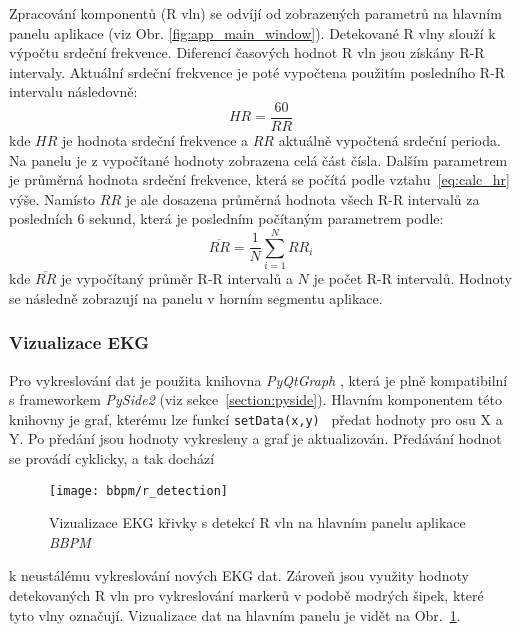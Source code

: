 Zpracování komponentů (R vln) se odvíjí od zobrazených parametrů na hlavním
panelu aplikace (viz Obr. \ref{fig:app_main_window}). Detekované R vlny slouží k 
výpočtu srdeční frekvence. Diferencí časových hodnot R vln jsou získány R-R intervaly. 
Aktuální srdeční frekvence je poté vypočtena použitím posledního R-R intervalu následovně:
\begin{equation}
    \label{eq:calc_hr}
    HR = \frac{60}{RR}
\end{equation}
kde $HR$ je hodnota srdeční frekvence a $RR$ aktuálně vypočtená srdeční
perioda. Na panelu je z vypočítané hodnoty zobrazena celá část čísla. Dalším
parametrem je průměrná hodnota srdeční frekvence, která se počítá podle
vztahu~\ref{eq:calc_hr} výše. Namísto $RR$ je ale dosazena průměrná hodnota
všech R-R intervalů za posledních 6 sekund, která je posledním počítaným
parametrem podle:
\begin{equation}
    \overline{RR} = \frac{1}{N} \sum_{i=1}^N RR_i
\end{equation}
kde $\overline{RR}$ je vypočítaný průměr R-R intervalů a $N$ je počet R-R
intervalů. Hodnoty se následně zobrazují na panelu v horním segmentu aplikace.

\subsubsection{Vizualizace EKG}
\label{section:visual}
Pro vykreslování dat je použita knihovna \textit{PyQtGraph} \cite{PyQtGraph},
která je plně kompatibilní s frameworkem \textit{PySide2} (viz
sekce~\ref{section:pyside}). Hlavním komponentem této knihovny je graf, kterému
lze funkcí \texttt{setData(x,y)}~\cite{curveItem} předat hodnoty pro osu X a Y.
Po předání jsou hodnoty vykresleny a graf je aktualizován. Předávání hodnot se 
provádí cyklicky, a tak dochází
\begin{figure}[H]
    \begin{center}
        \texttt{[image: bbpm/r\_detection]}
        \caption{Vizualizace EKG křivky s detekcí R vln na hlavním panelu
        aplikace \textit{BBPM}}
        \label{fig:app_ecg_visual}
    \end{center}
\end{figure}
\noindent k neustálému vykreslování nových EKG dat. Zároveň jsou využity hodnoty
detekovaných R vln pro vykreslování markerů v podobě modrých šipek, které tyto
vlny označují. Vizualizace dat na hlavním panelu je vidět na
Obr.~\ref{fig:app_ecg_visual}.

